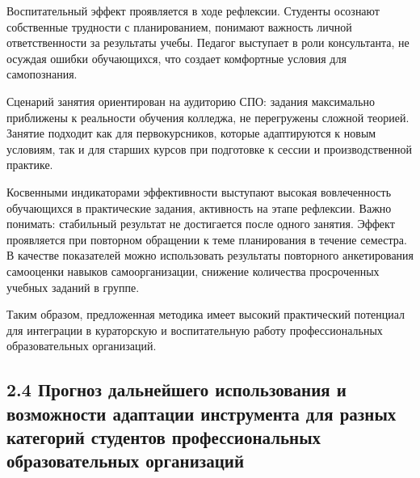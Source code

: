 \documentclass[
]{article}
\begin{document}
Воспитательный эффект проявляется в ходе рефлексии. Студенты осознают
собственные трудности с планированием, понимают важность личной
ответственности за результаты учебы. Педагог выступает в роли
консультанта, не осуждая ошибки обучающихся, что создает комфортные
условия для самопознания.

Сценарий занятия ориентирован на аудиторию СПО: задания максимально
приближены к реальности обучения колледжа, не перегружены сложной
теорией. Занятие подходит как для первокурсников, которые адаптируются к
новым условиям, так и для старших курсов при подготовке к сессии и
производственной практике.

Косвенными индикаторами эффективности выступают высокая вовлеченность
обучающихся в практические задания, активность на этапе рефлексии. Важно
понимать: стабильный результат не достигается после одного занятия.
Эффект проявляется при повторном обращении к теме планирования в течение
семестра. В качестве показателей можно использовать результаты
повторного анкетирования самооценки навыков самоорганизации, снижение
количества просроченных учебных заданий в группе.

Таким образом, предложенная методика имеет высокий практический
потенциал для интеграции в кураторскую и воспитательную работу
профессиональных образовательных организаций.

\subsection{\texorpdfstring{\textbf{2.4 Прогноз дальнейшего
использования и возможности адаптации инструмента для разных категорий
студентов профессиональных образовательных
организаций}}{2.4 Прогноз дальнейшего использования и возможности адаптации инструмента для разных категорий студентов профессиональных образовательных организаций}}\label{ux43fux440ux43eux433ux43dux43eux437-ux434ux430ux43bux44cux43dux435ux439ux448ux435ux433ux43e-ux438ux441ux43fux43eux43bux44cux437ux43eux432ux430ux43dux438ux44f-ux438-ux432ux43eux437ux43cux43eux436ux43dux43eux441ux442ux438-ux430ux434ux430ux43fux442ux430ux446ux438ux438-ux438ux43dux441ux442ux440ux443ux43cux435ux43dux442ux430-ux434ux43bux44f-ux440ux430ux437ux43dux44bux445-ux43aux430ux442ux435ux433ux43eux440ux438ux439-ux441ux442ux443ux434ux435ux43dux442ux43eux432-ux43fux440ux43eux444ux435ux441ux441ux438ux43eux43dux430ux43bux44cux43dux44bux445-ux43eux431ux440ux430ux437ux43eux432ux430ux442ux435ux43bux44cux43dux44bux445-ux43eux440ux433ux430ux43dux438ux437ux430ux446ux438ux439}
\end{document}
